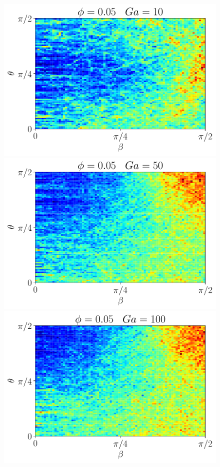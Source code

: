 \begin{figure}[h!]
    \centering
    \includegraphics[height =\size]{image/N_10/beta/2DMAP_beta_theta_dmin_10_Bo0_5PHI0_05mu_r0_42Ga10.pdf}
    \includegraphics[height =\size]{image/N_10/beta/2DMAP_beta_theta_dmin_10_Bo0_5PHI0_05mu_r0_42Ga50.pdf}
    \includegraphics[height =\size]{image/N_10/beta/2DMAP_beta_theta_dmin_10_Bo0_5PHI0_05mu_r0_42Ga100.pdf}

\end{figure}
